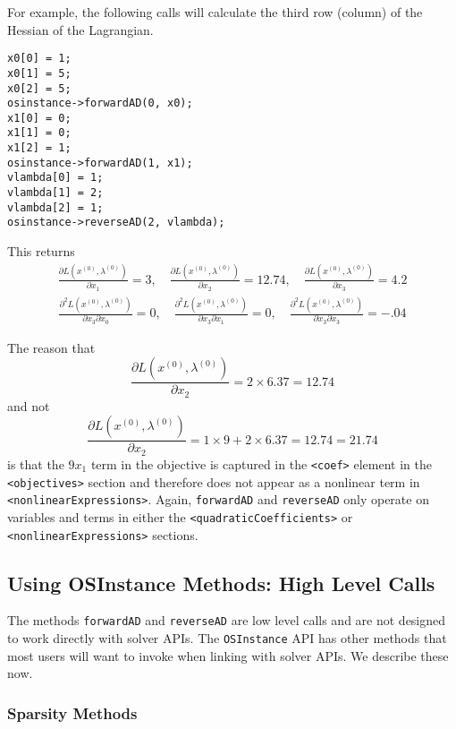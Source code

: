 \documentclass[11pt]{article}
\newcommand{\D}[2]{ \frac{\partial #1}{\partial #2} }
\newcommand{\DD}[3]{ \frac{\partial^2 #1}{\partial #2 \partial #3} }
\renewcommand{\_}{{\char"5F}}
\renewcommand{\{}{{\char"7B}}
\renewcommand{\}}{{\char"7D}}
\renewcommand{\^}{{\char"0D}}
\renewcommand{\'}{{\char"0D}}
\begin{document}
For example, the  following calls will calculate the third row (column) of the Hessian of the Lagrangian.
\begin{verbatim}
x0[0] = 1;
x0[1] = 5; 	
x0[2] = 5;
osinstance->forwardAD(0, x0);	
x1[0] = 0;
x1[1] = 0;
x1[2] = 1;
osinstance->forwardAD(1, x1);
vlambda[0] = 1;
vlambda[1] = 2;
vlambda[2] = 1;
osinstance->reverseAD(2, vlambda);
\end{verbatim}
This returns
\begin{eqnarray*}
\D{L (x^{(0)}, \lambda^{(0)})}{x_{1}} = 3, \quad  \D{L (x^{(0)}, \lambda^{(0)})}{x_{2}} = 12.74, \quad  \D{L (x^{(0)}, \lambda^{(0)})}{x_{3}} = 4.2
\end{eqnarray*}
\begin{eqnarray*}
\DD{L(x^{(0)}, \lambda^{(0)})}{x_{3}}{x_{0}} =0, \quad  \DD{L(x^{(0)}, \lambda^{(0)})}{x_{3}}{x_{1}} = 0, \quad   \DD{L(x^{(0)}, \lambda^{(0)})}{x_{3}}{x_{3}} =  -.04
\end{eqnarray*}

The reason that
$$
\D{L (x^{(0)}, \lambda^{(0)})}{x_{2}} = 2 \times 6.37 = 12.74
$$
and not
$$
\D{L (x^{(0)}, \lambda^{(0)})}{x_{2}} = 1 \times  9 + 2 \times 6.37 = 12.74  = 21.74
$$
is that the $9x_{1}$ term in the objective is captured in the {\tt <coef>} element in the {\tt <objectives>} section and therefore does not appear as a nonlinear term in {\tt  <nonlinearExpressions>}. Again, {\tt forwardAD} and {\tt reverseAD} only operate on variables and terms in either the {\tt <quadraticCoefficients>} or {\tt <nonlinearExpressions>} sections.

\subsection{Using OSInstance Methods: High Level Calls}

The methods {\tt forwardAD} and {\tt reverseAD} are low level calls and are not designed to work directly with solver APIs. The {\tt OSInstance} API has other methods that most users will want to invoke when linking with solver APIs.  We describe these now.


\subsubsection{Sparsity Methods}
\end{document}
